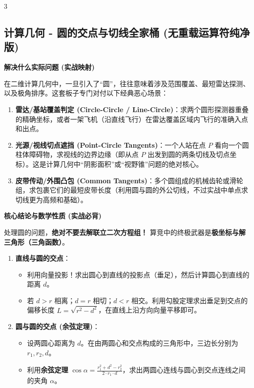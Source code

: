 \documentclass[10pt,landscape,a4paper]{article}
\begin{document}
\begin{multicols*}{3}
\subsection*{计算几何 - 圆的交点与切线全家桶 (无重载运算符纯净版)}
\par\addvspace{0.7ex}\noindent\textbf{解决什么实际问题 (实战映射)}\par\nobreak
在二维计算几何中，一旦引入了“圆”，往往意味着涉及范围覆盖、最短雷达探测、以及极角排序。这套板子专门对付以下经典恶心场景：\par
\begin{enumerate}[start=1]
\item \textbf{雷达/基站覆盖判定 (Circle-Circle / Line-Circle)}：求两个圆形探测器重叠的精确坐标，或者一架飞机（沿直线飞行）在雷达覆盖区域内飞行的准确入点和出点。
\item \textbf{光源/视线切点遮挡 (Point-Circle Tangents)}：一个人站在点 $P$ 看向一个圆柱体障碍物，求视线的边界边缘（即从点 $P$ 出发到圆的两条切线及切点坐标）。这是计算几何中“阴影面积”或“视野锥”问题的绝对核心。
\item \textbf{皮带传动/外围凸包 (Common Tangents)}：多个圆组成的机械齿轮或滑轮组，求包裹它们的最短皮带长度（利用圆与圆的外公切线，不过实战中单点求切线更为高频和基础）。
\end{enumerate}
\par\addvspace{0.7ex}\noindent\textbf{核心结论与数学性质 (实战必背)}\par\nobreak
处理圆的问题，\textbf{绝对不要去解联立二次方程组！} 算竞中的终极武器是\textbf{极坐标与解三角形（三角函数）}。\par
\begin{enumerate}[start=1]
\item \textbf{直线与圆的交点}：
\begin{itemize}
\item 利用向量投影！求出圆心到直线的投影点（垂足），然后计算圆心到直线的距离 $d$。
\item 若 $d > r$ 相离；$d = r$ 相切；$d < r$ 相交。利用勾股定理求出垂足到交点的偏移长度 $L = \sqrt{r^2 - d^2}$，在直线上沿方向向量平移即可。
\end{itemize}
\item \textbf{圆与圆的交点 (余弦定理)}：
\begin{itemize}
\item 设两圆心距离为 $d$。在由两圆心和交点构成的三角形中，三边长分别为 $r_1, r_2, d$。
\item 利用\textbf{余弦定理} $\cos \alpha = \frac{r_1^2 + d^2 - r_2^2}{2 \cdot r_1 \cdot d}$，求出两圆心连线与圆心到交点连线之间的夹角 $\alpha$。

\end{itemize}
\end{enumerate}
\end{multicols*}
\end{document}
